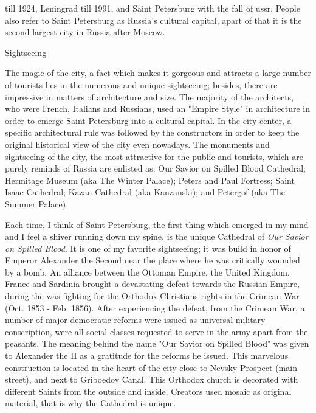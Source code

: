 \documentclass[10pt,a4paper]{article} %
\newcommand{\NewsItem}[1]{ %
\usefont{T1}{fvs}{n}{n} %
\vspace{24pt}\large #1\vspace{3pt} %
\par \normalsize \normalfont}
\begin{document}
\begin{multicols}{3} %


till 1924, Leningrad till 1991, 
and Saint Petersburg with the fall of {\sc ussr}. 
People also refer to Saint Petersburg as Russia's cultural capital, 
apart of that it is the second largest city in Russia after Moscow.

\NewsItem{Sightseeing}

The magic of the city, a fact which makes it gorgeous and attracts 
a large number of tourists lies in the numerous and unique sightseeing; 
besides, there are impressive in matters of architecture and size. 
The majority of the architects, who were French, Italians and Russians, 
used an "Empire Style" in architecture in order to emerge Saint Petersburg 
into a cultural capital. 
In the city center, a specific architectural rule was followed 
by the constructors in order to keep the original historical view of the city even nowadays. 
The monuments and sightseeing of the city, the most attractive for the public and tourists, 
which are purely reminds of Russia are enlisted as: Our Savior on Spilled Blood Cathedral; 
Hermitage Museum (aka The Winter Palace); Peters and Paul Fortress; Saint Isaac Cathedral; 
Kazan Cathedral (aka Kanzanski); and Petergof (aka The Summer Palace).

Each time, I think of Saint Petersburg, the first thing which emerged in my mind and 
I feel a shiver running down my spine, is the unique Cathedral 
of \textit{Our Savior on Spilled Blood}. 
It is one of my favorite sightseeing; it was build in honor of Emperor Alexander 
the Second near the place where he was critically wounded by a bomb. 
An alliance between the Ottoman Empire, the United Kingdom, 
France and Sardinia brought a devastating defeat towards the Russian Empire, 
during the was fighting for the Orthodox Christians rights in the Crimean War 
(Oct. 1853 - Feb. 1856). 
After experiencing the defeat, from the Crimean War, 
a number of major democratic reforms were issued as universal military conscription, 
were all social classes requested to serve in the army apart from the peasants. 
The meaning behind the name "Our Savior on Spilled Blood" was given to 
Alexander the II as a gratitude for the reforms he issued. 
This marvelous construction is located in the heart of the city close 
to Nevsky Prospect (main street), and next to Griboedov Canal. 
This Orthodox church is decorated with different Saints from the outside and inside. 
Creators used mosaic as original material, that is why the Cathedral is unique.


\end{multicols}
\end{document}

